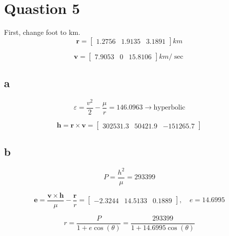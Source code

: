 \section{Quastion 5}
First, change foot to km.
$$
\boldsymbol r = \begin{bmatrix}
    1.2756  &  1.9135  &  3.1891
\end{bmatrix} km
$$

$$
\boldsymbol v = \begin{bmatrix}
    7.9053     &    0  & 15.8106
\end{bmatrix} km/\sec
$$
\subsection{a}
$$
\varepsilon = \dfrac{v^2}{2} - \dfrac{\mu}{r} = 146.0963 \to \text{hyperbolic}
$$

$$
\boldsymbol h = \boldsymbol r \times \boldsymbol v  = \begin{bmatrix}
    302531.3 & 50421.9 & -151265.7
\end{bmatrix}
$$

\subsection{b}

$$
P = \dfrac{h^2}{\mu} = 293399
$$


$$
\boldsymbol e = \dfrac{\boldsymbol v \times \boldsymbol h}{\mu} - \dfrac{\boldsymbol r}{r} = \begin{bmatrix}
    -2.3244 &  14.5133  &  0.1889
\end{bmatrix}, \quad e = 14.6995
$$

$$
r = \dfrac{P}{1+e\cos(\theta)} = \dfrac{293399}{1 + 14.6995 \cos(\theta)}
$$


